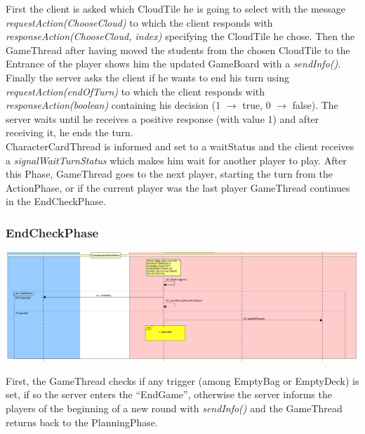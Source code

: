 \documentclass[12pt]{article}
\begin{document}
				First the client is asked which CloudTile he is going to select with the message \emph{requestAction(ChooseCloud)} to which the client responds with \emph{responseAction(ChooseCloud, index)} specifying the CloudTile he chose. Then the GameThread after having moved the students from the chosen CloudTile to the Entrance of the player shows him the updated GameBoard with a \emph{sendInfo()}. \\
				Finally the server asks the client if he wants to end his turn using \emph{requestAction(endOfTurn)} to which the client responds with \emph{responseAction(boolean)} containing his decision (1 \(\rightarrow\) true, 0 \(\rightarrow\) false). The server waits until he receives a positive response (with value 1) and after receiving it, he ends the turn. \\
				CharacterCardThread is informed and set to a waitStatus and the client receives a \emph{signalWaitTurnStatus} which makes him wait for another player to play. 
				After this Phase, GameThread goes to the next player, starting the turn from the ActionPhase, or if the current player was the last player GameThread continues in the EndCheckPhase.
							
			\subsubsection{EndCheckPhase}
			
				\begin{center}
					\includegraphics[width=\textwidth,height=\textheight,keepaspectratio]{Game_5}
				\end{center}
				
				First, the GameThread checks if any trigger (among EmptyBag or EmptyDeck) is set, if so the server enters the ``EndGame'', otherwise the server informs the players of the beginning of a new round with \emph{sendInfo()} and the GameThread returns back to the PlanningPhase.
				
\end{document}
